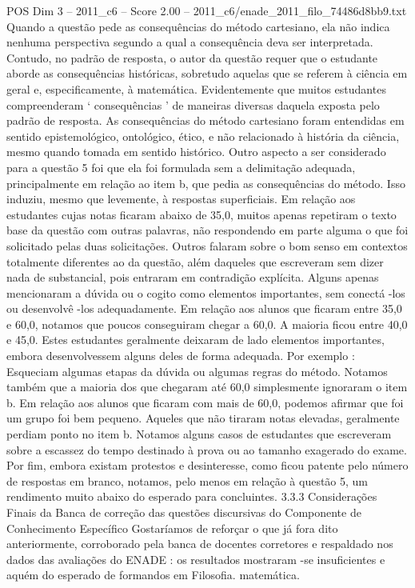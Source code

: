 \begin{textsample}{POS Dim 3 – 2011\_c6 – Score 2.00 – 2011\_c6/enade\_2011\_filo\_74486d8bb9.txt}
Quando a questão pede as consequências do método cartesiano, ela não indica nenhuma perspectiva segundo a qual a consequência deva ser interpretada.
Contudo, no padrão de resposta, o autor da questão requer que o estudante aborde as consequências históricas, sobretudo aquelas que se referem à ciência em geral e, especificamente, à matemática.
Evidentemente que muitos estudantes compreenderam ‘ consequências ’ de maneiras diversas daquela exposta pelo padrão de resposta.
As consequências do método cartesiano foram entendidas em sentido epistemológico, ontológico, ético, e não relacionado à história da ciência, mesmo quando tomada em sentido histórico.
Outro aspecto a ser considerado para a questão 5 foi que ela foi formulada sem a delimitação adequada, principalmente em relação ao item b, que pedia as consequências do método.
Isso induziu, mesmo que levemente, à respostas superficiais.
Em relação aos estudantes cujas notas ficaram abaixo de 35,0, muitos apenas repetiram o texto base da questão com outras palavras, não respondendo em parte alguma o que foi solicitado pelas duas solicitações.
Outros falaram sobre o bom senso em contextos totalmente diferentes ao da questão, além daqueles que escreveram sem dizer nada de substancial, pois entraram em contradição explícita.
Alguns apenas mencionaram a dúvida ou o cogito como elementos importantes, sem conectá -los ou desenvolvê -los adequadamente.
Em relação aos alunos que ficaram entre 35,0 e 60,0, notamos que poucos conseguiram chegar a 60,0.
A maioria ficou entre 40,0 e 45,0.
Estes estudantes geralmente deixaram de lado elementos importantes, embora desenvolvessem alguns deles de forma adequada.
Por exemplo : Esqueciam algumas etapas da dúvida ou algumas regras do método.
Notamos também que a maioria dos que chegaram até 60,0 simplesmente ignoraram o item b.
Em relação aos alunos que ficaram com mais de 60,0, podemos afirmar que foi um grupo foi bem pequeno.
Aqueles que não tiraram notas elevadas, geralmente perdiam ponto no item b.
Notamos alguns casos de estudantes que escreveram sobre a escassez do tempo destinado à prova ou ao tamanho exagerado do exame.
Por fim, embora existam protestos e desinteresse, como ficou patente pelo número de respostas em branco, notamos, pelo menos em relação à questão 5, um rendimento muito abaixo do esperado para concluintes. 3.3.3 Considerações Finais da Banca de correção das questões discursivas do Componente de Conhecimento Específico Gostaríamos de reforçar o que já fora dito anteriormente, corroborado pela banca de docentes corretores e respaldado nos dados das avaliações do ENADE : os resultados mostraram -se insuficientes e aquém do esperado de formandos em Filosofia. matemática.

\end{textsample}
